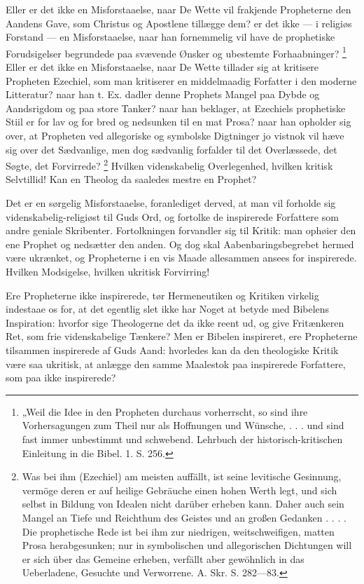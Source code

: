\documentclass[12pt,a4paper]{book}
\newcommand{\opage}[1]{\marginnote{\footnotesize\textit{[#1]}}}
\begin{document}
Eller er det ikke en Misforstaaelse, naar De Wette vil frakjende
Propheterne den Aandens Gave, som Christus og Apostlene tillægge dem? er
det ikke --- i religiøs Forstand --- en Misforstaaelse, naar han
fornemmelig vil have de prophetiske Forudsigelser begrundede paa svævende
Ønsker og ubestemte Forhaabninger?%
\footnote{„Weil die Idee in den Propheten durchaus vorherrscht, so sind
ihre Vorhersagungen zum Theil nur als Hoffnungen und Wünsche, . . . und
sind fast immer unbestimmt und schwebend. Lehrbuch der
historisch-kritischen Einleitung in die Bibel. 1. S. 256.}
Eller er det ikke en Misforstaaelse, naar De Wette tillader sig
at kritisere Propheten Ezechiel, som man kritiserer en middelmaadig
Forfatter i den moderne Litteratur? naar han t.
\opage{58} Ex. dadler denne Prophets Mangel paa Dybde og Aandsrigdom og paa store
Tanker? naar han beklager, at Ezechiels prophetiske Stiil er for lav og
for bred og nedsunken til en mat Prosa? naar han opholder sig over, at
Propheten ved allegoriske og symbolske Digtninger jo vistnok vil hæve sig
over det Sædvanlige, men dog sædvanlig forfalder til det Overlæssede, det
Søgte, det Forvirrede?%
\footnote{Was bei ihm (Ezechiel) am meisten auffällt, ist seine
levitische Gesinnung, vermöge deren er auf heilige Gebräuche einen hohen
Werth legt, und sich selbst in Bildung von Idealen nicht darüber erheben
kann. Daher auch sein Mangel an Tiefe und Reichthum des Geistes und an
großen Gedanken . . . . Die prophetische Rede ist bei ihm zur niedrigen,
weitschweifigen, matten Prosa herabgesunken; nur in symbolischen und
allegorischen Dichtungen will er sich über das Gemeine erheben, verfällt
aber gewöhnlich in das Ueberladene, Gesuchte und Verworrene. A. Skr. S.
282---83.}
Hvilken videnskabelig Overlegenhed, hvilken kritisk Selvtillid! Kan en
Theolog da saaledes mestre en Prophet?

Det er en sørgelig Misforstaaelse, foranlediget derved, at man vil
forholde sig videnskabelig-religiøst til Guds Ord, og fortolke de
inspirerede Forfattere som andre geniale Skribenter. Fortolkningen
forvandler sig til Kritik: man ophøier den ene Prophet og nedsætter den
anden. Og dog skal Aabenbaringsbegrebet hermed være ukrænket, og
Propheterne i en vis Maade allesammen ansees for inspirerede. Hvilken
Modsigelse, hvilken ukritisk Forvirring!

Ere Propheterne ikke inspirerede, tør Hermeneutiken og Kritiken virkelig
indestaae os for, at det egentlig slet ikke har Noget at betyde med
Bibelens Inspiration: hvorfor sige Theologerne det da ikke reent ud, og
give Fritænkeren Ret, som frie videnskabelige Tænkere? Men er Bibelen
inspireret, ere Propheterne tilsammen inspirerede af Guds Aand: hvorledes
kan da den theologiske Kritik være saa ukritisk, at anlægge den samme
Maalestok paa inspirerede Forfattere, som paa ikke inspirerede?
\end{document}
